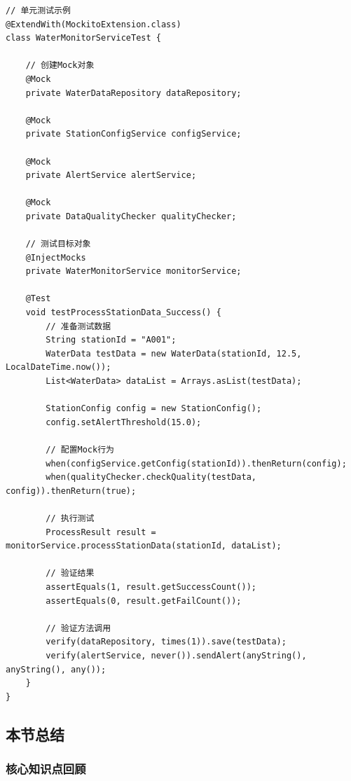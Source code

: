 \begin{lstlisting}[style=java]
// 单元测试示例
@ExtendWith(MockitoExtension.class)
class WaterMonitorServiceTest {
    
    // 创建Mock对象
    @Mock
    private WaterDataRepository dataRepository;
    
    @Mock
    private StationConfigService configService;
    
    @Mock
    private AlertService alertService;
    
    @Mock
    private DataQualityChecker qualityChecker;
    
    // 测试目标对象
    @InjectMocks
    private WaterMonitorService monitorService;
    
    @Test
    void testProcessStationData_Success() {
        // 准备测试数据
        String stationId = "A001";
        WaterData testData = new WaterData(stationId, 12.5, LocalDateTime.now());
        List<WaterData> dataList = Arrays.asList(testData);
        
        StationConfig config = new StationConfig();
        config.setAlertThreshold(15.0);
        
        // 配置Mock行为
        when(configService.getConfig(stationId)).thenReturn(config);
        when(qualityChecker.checkQuality(testData, config)).thenReturn(true);
        
        // 执行测试
        ProcessResult result = monitorService.processStationData(stationId, dataList);
        
        // 验证结果
        assertEquals(1, result.getSuccessCount());
        assertEquals(0, result.getFailCount());
        
        // 验证方法调用
        verify(dataRepository, times(1)).save(testData);
        verify(alertService, never()).sendAlert(anyString(), anyString(), any());
    }
}
\end{lstlisting}

\hypertarget{ux672cux8282ux603bux7ed3-2}{%
\subsection{本节总结}\label{ux672cux8282ux603bux7ed3-2}}

\hypertarget{ux6838ux5fc3ux77e5ux8bc6ux70b9ux56deux987e-2}{%
\subsubsection{核心知识点回顾}\label{ux6838ux5fc3ux77e5ux8bc6ux70b9ux56deux987e-2}}

